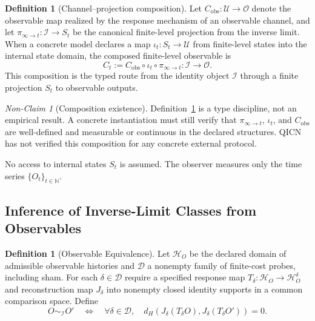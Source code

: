 \documentclass[11pt,a4paper]{article}
\theoremstyle{plain}
\theoremstyle{definition}
\newtheorem{definition}[theorem]{Definition}
\theoremstyle{remark}
\newtheorem{nonclaim}[theorem]{Non-Claim}
\begin{document}
\begin{definition}[Channel--projection composition]\label{def:channel-projection}
Let $C_{\mathrm{obs}}:\mathcal{U}\to\mathcal{O}$ denote the observable map realized by the response mechanism of an observable channel, and let $\pi_{\infty\to t}:\mathcal{I}\to S_t$ be the canonical finite-level projection from the inverse limit. When a concrete model declares a map $\iota_t:S_t\to\mathcal{U}$ from finite-level states into the internal state domain, the composed finite-level observable is
\begin{equation}
    C_t := C_{\mathrm{obs}}\circ \iota_t\circ \pi_{\infty\to t} : \mathcal{I}\to\mathcal{O}.
\end{equation}
This composition is the typed route from the identity object $\mathcal{I}$ through a finite projection $S_t$ to observable outputs.
\end{definition}

\begin{nonclaim}[Composition existence]\label{nonclaim:channel-projection}
Definition~\ref{def:channel-projection} is a type discipline, not an empirical result. A concrete instantiation must still verify that $\pi_{\infty\to t}$, $\iota_t$, and $C_{\mathrm{obs}}$ are well-defined and measurable or continuous in the declared structures. QICN has not verified this composition for any concrete external protocol.
\end{nonclaim}

No access to internal states $S_t$ is assumed. The observer measures only the time series $\{O_t\}_{t \in \mathbb{N}}$.

\subsection{Inference of Inverse-Limit Classes from Observables}

\begin{definition}[Observable Equivalence]\label{def:obs-equiv}
Let $\mathcal H_O$ be the declared domain of admissible observable histories and $\mathcal D$ a nonempty family of finite-cost probes, including sham. For each $\delta\in\mathcal D$ require a specified response map $T_\delta:\mathcal H_O\to\mathcal H_O^{\delta}$ and reconstruction map $J_\delta$ into nonempty closed identity supports in a common comparison space. Define
\[
 O\sim_{\mathcal I}O'\quad\Longleftrightarrow\quad
 \forall\delta\in\mathcal D,\quad d_H(J_\delta(T_\delta O),J_\delta(T_\delta O'))=0.
\]
\end{definition}
\end{document}
